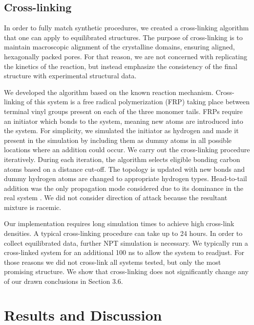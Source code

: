 \documentclass[journal=jpcbfk,manusciprt=article]{achemso}
\begin{document}
  \subsection{Cross-linking}
  
  In order to fully match synthetic procedures, we created a cross-linking
  algorithm that one can apply to equilibrated structures. The purpose of
  cross-linking is to maintain macroscopic alignment of the crystalline domains,
  ensuring aligned, hexagonally packed pores. For that reason, we are not
  concerned with replicating the kinetics of the reaction, but instead emphasize
  the consistency of the final structure with experimental structural data. 

  We developed the algorithm based on the known reaction mechanism.
  Cross-linking of this system is a free radical polymerization (FRP) taking
  place between terminal vinyl groups present on each of the three monomer tails.
  FRPs require an initiator which bonds to the system, meaning new atoms are
  introduced into the system. For simplicity, we simulated the initiator as
  hydrogen and made it present in the simulation by including them as dummy atoms
  in all possible locations where an addition could occur. We carry out the
  cross-linking procedure iteratively. During each iteration, the algorithm
  selects eligible bonding carbon atoms based on a distance cut-off. The topology
  is updated with new bonds and dummy hydrogen atoms are changed to appropriate
  hydrogen types.  Head-to-tail addition was the only propagation mode considered
  due to its dominance in the real system \cite{young_introduction_2011}. We did
  not consider direction of attack because the resultant mixture is racemic.

  Our implementation requires long simulation times to achieve high cross-link 
  densities. A typical cross-linking procedure can take up to 24 hours. In
  order to collect equilibrated data, further NPT simulation is necessary. We
  typically run a cross-linked system for an additional 100 ns to allow the system
  to readjust. For those reasons we did not cross-link all systems tested, but only
  the most promising structure. We show that cross-linking does not significantly
  change any of our drawn conclusions in Section 3.6.

  \section{Results and Discussion}
  
\end{document}
